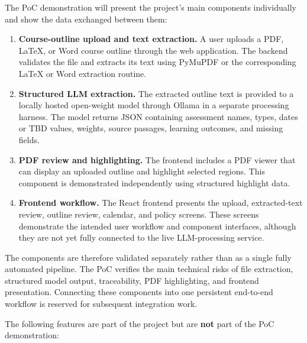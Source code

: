\documentclass{article}
\begin{document}
\bigskip
\noindent The PoC demonstration will present the project's main components
individually and show the data exchanged between them:

\begin{enumerate}
  \item \textbf{Course-outline upload and text extraction.} A user uploads a
  PDF, LaTeX, or Word course outline through the web application. The backend
  validates the file and extracts its text using PyMuPDF or the corresponding
  LaTeX or Word extraction routine.

  \item \textbf{Structured LLM extraction.} The extracted outline text is
  provided to a locally hosted open-weight model through Ollama in a separate
  processing harness. The model returns JSON containing assessment names,
  types, dates or TBD values, weights, source passages, learning outcomes,
  and missing fields.

  \item \textbf{PDF review and highlighting.} The frontend includes a PDF
  viewer that can display an uploaded outline and highlight selected regions.
  This component is demonstrated independently using structured highlight
  data.

  \item \textbf{Frontend workflow.} The React frontend presents the upload,
  extracted-text review, outline review, calendar, and policy screens. These
  screens demonstrate the intended user workflow and component interfaces,
  although they are not yet fully connected to the live LLM-processing
  service.
\end{enumerate}

\bigskip
\noindent The components are therefore validated separately rather than as a
single fully automated pipeline. The PoC verifies the main technical risks
of file extraction, structured model output, traceability, PDF highlighting,
and frontend presentation. Connecting these components into one persistent
end-to-end workflow is reserved for subsequent integration work.

\bigskip
\noindent The following features are part of the project but are
\textbf{not} part of the PoC demonstration:
\end{document}
